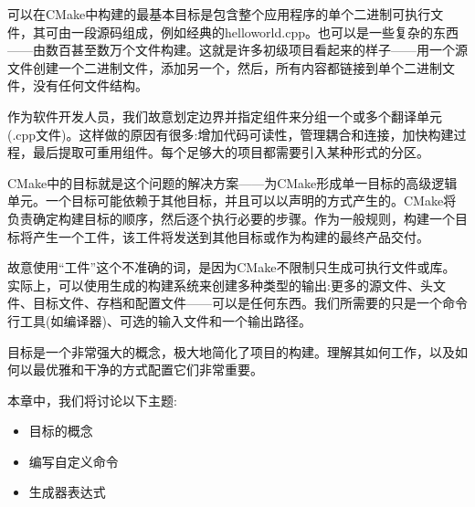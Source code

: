 
可以在CMake中构建的最基本目标是包含整个应用程序的单个二进制可执行文件，其可由一段源码组成，例如经典的helloworld.cpp。也可以是一些复杂的东西——由数百甚至数万个文件构建。这就是许多初级项目看起来的样子——用一个源文件创建一个二进制文件，添加另一个，然后，所有内容都链接到单个二进制文件，没有任何文件结构。

作为软件开发人员，我们故意划定边界并指定组件来分组一个或多个翻译单元(.cpp文件)。这样做的原因有很多:增加代码可读性，管理耦合和连接，加快构建过程，最后提取可重用组件。每个足够大的项目都需要引入某种形式的分区。

CMake中的目标就是这个问题的解决方案——为CMake形成单一目标的高级逻辑单元。一个目标可能依赖于其他目标，并且可以以声明的方式产生的。CMake将负责确定构建目标的顺序，然后逐个执行必要的步骤。作为一般规则，构建一个目标将产生一个工件，该工件将发送到其他目标或作为构建的最终产品交付。

故意使用“工件”这个不准确的词，是因为CMake不限制只生成可执行文件或库。实际上，可以使用生成的构建系统来创建多种类型的输出:更多的源文件、头文件、目标文件、存档和配置文件——可以是任何东西。我们所需要的只是一个命令行工具(如编译器)、可选的输入文件和一个输出路径。

目标是一个非常强大的概念，极大地简化了项目的构建。理解其如何工作，以及如何以最优雅和干净的方式配置它们非常重要。

本章中，我们将讨论以下主题:

\begin{itemize}
\item 
目标的概念

\item 
编写自定义命令

\item 
生成器表达式
\end{itemize}